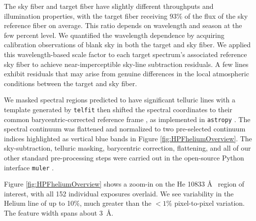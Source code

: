 \documentclass[twocolumn]{aastex631}
\begin{document}
The sky fiber and target fiber have slightly different throughputs and illumination properties, with the target fiber receiving $93\%$ of the flux of the sky reference fiber on average.  This ratio depends on wavelength and season at the few percent level.  We quantified the wavelength dependence by acquiring calibration observations of blank sky in both the target and sky fiber.  We applied this wavelength-based scale factor to each target spectrum's associated reference sky fiber to achieve near-imperceptible sky-line subtraction residuals.  A few lines exhibit residuals that may arise from genuine differences in the local atmospheric conditions between the target and sky fiber.

We masked spectral regions predicted to have significant telluric lines with a template generated by \texttt{telfit} \citep{2014AJ....148...53G} then shifted the spectral coordinates to their common barycentric-corrected reference frame \citep{2014PASP..126..838W}, as implemented in \texttt{astropy} \citep{2013A&A...558A..33A,2018AJ....156..123A,2022ApJ...935..167A}.  The spectral continuum was flattened and normalized to two pre-selected continuum indices highlighted as vertical blue bands in Figure \ref{fig:HPFheliumOverview}.  The sky-subtraction, telluric masking, barycentric correction, flattening, and all of our other standard pre-processing steps were carried out in the open-source Python interface \texttt{muler} \citep{2022JOSS....7.4302G}.

Figure \ref{fig:HPFheliumOverview} shows a zoom-in on the He 10833 \AA~ region of interest, with all 152 individual exposures overlaid.  We see variability in the Helium line of up to 10\%, much greater than the $<1\%$ pixel-to-pixel variation.  The feature width spans about 3~\AA.
\end{document}
